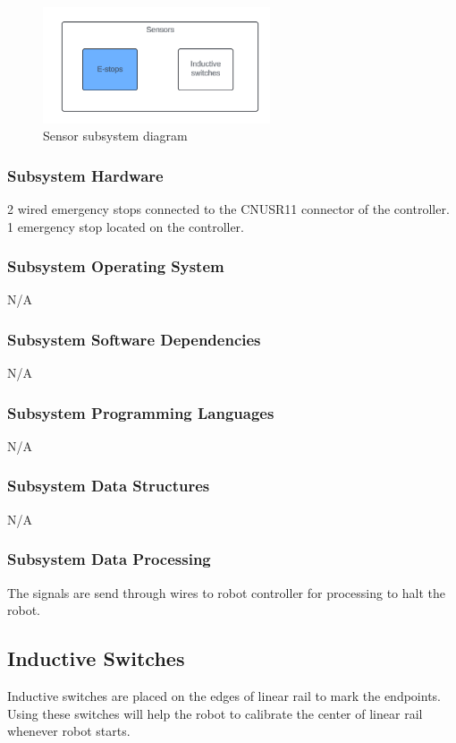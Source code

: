 \begin{figure}[h!]
	\centering
 	\includegraphics[width=0.60\textwidth]{images/E_stop_sensor.png}
 \caption{Sensor subsystem diagram}
\end{figure}

\subsubsection{Subsystem Hardware}
2 wired emergency stops connected to the CNUSR11 connector of the controller. 1 emergency stop located on the controller.

\subsubsection{Subsystem Operating System}
N/A

\subsubsection{Subsystem Software Dependencies}
N/A

\subsubsection{Subsystem Programming Languages}
N/A

\subsubsection{Subsystem Data Structures}
N/A

\subsubsection{Subsystem Data Processing}
The signals are send through wires to robot controller for processing to halt the robot.

\subsection{Inductive Switches}
Inductive switches are placed on the edges of linear rail to mark the endpoints. Using these switches will help the robot to calibrate the center of linear rail whenever robot starts.

